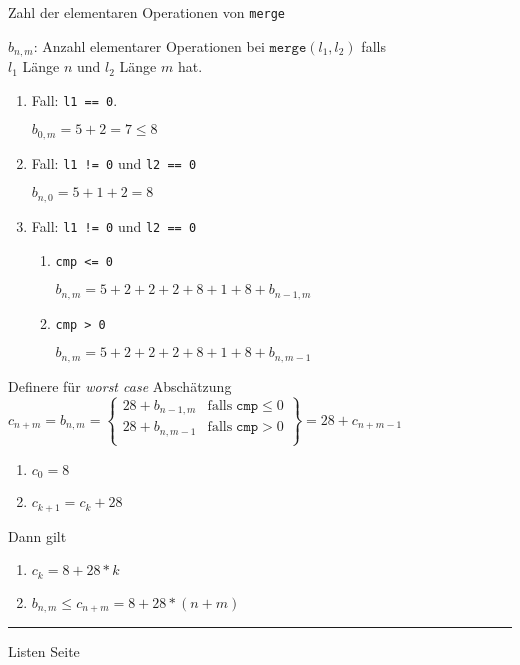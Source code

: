 
\begin{slide}{}
\normalsize

\begin{center}
Zahl der elementaren Operationen von \texttt{merge}
\end{center}
\vspace*{0.5cm}

\footnotesize
$b_{n,m}$: Anzahl elementarer Operationen bei $\texttt{merge}(l_1, l_2)$ falls\\[0.3cm]
\hspace*{1.3cm}  $l_1$ L\"ange $n$ und $l_2$ L\"ange $m$ hat.

\begin{enumerate}
\item Fall: \texttt{l1 == 0}.

      $b_{0,m} = 5 + 2 = 7 \leq 8$
\item Fall: \texttt{l1 != 0} und \texttt{l2 == 0}

      $b_{n,0} = 5 + 1 + 2 = 8$
\item Fall: \texttt{l1 != 0} und \texttt{l2 == 0} 
      \begin{enumerate}
      \item \texttt{cmp <= 0}

            $b_{n,m} = 5 + 2 + 2 + 2 + 8 + 1 + 8 + b_{n-1,m}$
      \item \texttt{cmp > 0}

            $b_{n,m} = 5 + 2 + 2 + 2 + 8 + 1 + 8 + b_{n,m-1}$
      \end{enumerate}
\end{enumerate}
Definere f\"ur \emph{worst case} Absch\"atzung \\[0.3cm]
 $c_{n + m} = b_{n,m} = \left\{ \begin{array}{ll}
                                                 28 + b_{n-1,m} & \mbox{falls}\; \mathtt{cmp} \leq 0 \\[0.2cm]
                                                 28 + b_{n,m-1} & \mbox{falls}\; \mathtt{cmp} > 0 \\
                                                   \end{array} \right\} = 28 + c_{n + m - 1}$ 
\begin{enumerate}
\item $c_0 = 8$
\item $c_{k+1} = c_k + 28$
\end{enumerate}
Dann gilt 
\begin{enumerate}
\item $c_k = 8 + 28 * k$
\item $b_{n,m} \leq c_{n+m} = 8 + 28 * (n + m)$
\end{enumerate}

\vspace*{\fill}
\tiny \addtocounter{mypage}{1}
\rule{17cm}{1mm}
Listen  \hspace*{\fill} Seite 
\end{slide}

